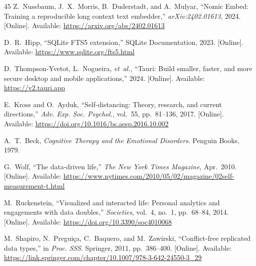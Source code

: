 \documentclass[conference]{IEEEtran}
\begin{document}
\begin{thebibliography}{45}
Z.~Nussbaum, J.~X.~Morris, B.~Duderstadt, and A.~Mulyar, ``Nomic Embed: Training a reproducible long context text embedder,'' \emph{arXiv:2402.01613}, 2024. [Online]. Available: \url{https://arxiv.org/abs/2402.01613}

D.~R.~Hipp, ``SQLite FTS5 extension,'' SQLite Documentation, 2023. [Online]. Available: \url{https://www.sqlite.org/fts5.html}

D.~Thompson-Yvetot, L.~Nogueira, \emph{et~al.}, ``Tauri: Build smaller, faster, and more secure desktop and mobile applications,'' 2024. [Online]. Available: \url{https://v2.tauri.app}

E.~Kross and O.~Ayduk, ``Self-distancing: Theory, research, and current directions,'' \emph{Adv. Exp. Soc. Psychol.}, vol.~55, pp.~81--136, 2017. [Online]. Available: \url{https://doi.org/10.1016/bs.aesp.2016.10.002}

A.~T.~Beck, \emph{Cognitive Therapy and the Emotional Disorders}. Penguin Books, 1979.

G.~Wolf, ``The data-driven life,'' \emph{The New York Times Magazine}, Apr.~2010. [Online]. Available: \url{https://www.nytimes.com/2010/05/02/magazine/02self-measurement-t.html}

M.~Ruckenstein, ``Visualized and interacted life: Personal analytics and engagements with data doubles,'' \emph{Societies}, vol.~4, no.~1, pp.~68--84, 2014. [Online]. Available: \url{https://doi.org/10.3390/soc4010068}

M.~Shapiro, N.~Pregui\c{c}a, C.~Baquero, and M.~Zawirski, ``Conflict-free replicated data types,'' in \emph{Proc. SSS}. Springer, 2011, pp.~386--400. [Online]. Available: \url{https://link.springer.com/chapter/10.1007/978-3-642-24550-3_29}

\end{thebibliography}
\end{document}
